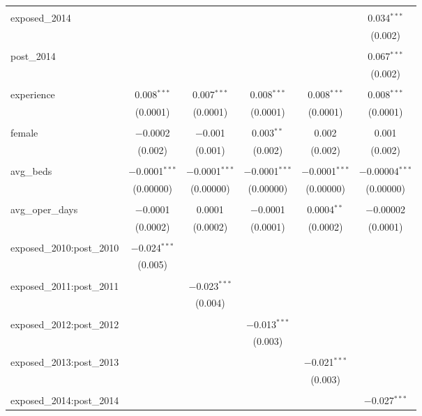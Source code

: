 \begin{table}[!htbp]
\begin{adjustbox}{width=\textwidth}
\begin{tabular}{@{\extracolsep{5pt}}lccccc}
  & & & & & \\ 
 exposed\_2014 &  &  &  &  & 0.034$^{***}$ \\ 
  &  &  &  &  & (0.002) \\ 
  & & & & & \\ 
 post\_2014 &  &  &  &  & 0.067$^{***}$ \\ 
  &  &  &  &  & (0.002) \\ 
  & & & & & \\ 
 experience & 0.008$^{***}$ & 0.007$^{***}$ & 0.008$^{***}$ & 0.008$^{***}$ & 0.008$^{***}$ \\ 
  & (0.0001) & (0.0001) & (0.0001) & (0.0001) & (0.0001) \\ 
  & & & & & \\ 
 female & $-$0.0002 & $-$0.001 & 0.003$^{**}$ & 0.002 & 0.001 \\ 
  & (0.002) & (0.001) & (0.002) & (0.002) & (0.002) \\ 
  & & & & & \\ 
 avg\_beds & $-$0.0001$^{***}$ & $-$0.0001$^{***}$ & $-$0.0001$^{***}$ & $-$0.0001$^{***}$ & $-$0.00004$^{***}$ \\ 
  & (0.00000) & (0.00000) & (0.00000) & (0.00000) & (0.00000) \\ 
  & & & & & \\ 
 avg\_oper\_days & $-$0.0001 & 0.0001 & $-$0.0001 & 0.0004$^{**}$ & $-$0.00002 \\ 
  & (0.0002) & (0.0002) & (0.0001) & (0.0002) & (0.0001) \\ 
  & & & & & \\ 
 exposed\_2010:post\_2010 & $-$0.024$^{***}$ &  &  &  &  \\ 
  & (0.005) &  &  &  &  \\ 
  & & & & & \\ 
 exposed\_2011:post\_2011 &  & $-$0.023$^{***}$ &  &  &  \\ 
  &  & (0.004) &  &  &  \\ 
  & & & & & \\ 
 exposed\_2012:post\_2012 &  &  & $-$0.013$^{***}$ &  &  \\ 
  &  &  & (0.003) &  &  \\ 
  & & & & & \\ 
 exposed\_2013:post\_2013 &  &  &  & $-$0.021$^{***}$ &  \\ 
  &  &  &  & (0.003) &  \\ 
  & & & & & \\ 
 exposed\_2014:post\_2014 &  &  &  &  & $-$0.027$^{***}$ \\ 

\end{tabular}
\end{adjustbox}
\end{table}
